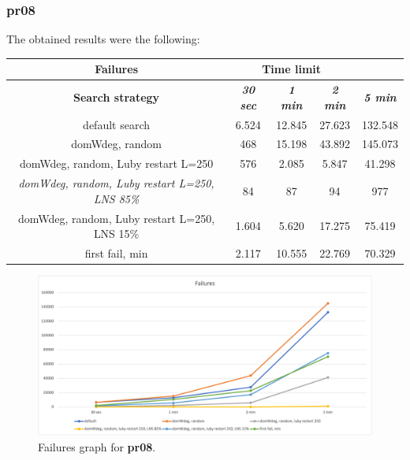 \subsubsection{pr08}
The obtained results were the following:
{
\renewcommand{\arraystretch}{2}
\begin{longtable}[h]{| c | c | c | c | c |}
    \hline
    \textbf{Failures} & \multicolumn{3}{c}{Time limit} & \\
    \hline
    \textbf{Search strategy} & \textbf{\textit{30 sec}} & \textbf{\textit{1 min}} & \textbf{\textit{2 min}} & \textbf{\textit{5 min}} \\
    \hline
    \endhead
    default search                                         & 6.524 & 12.845 &  27.623 & 132.548 \\
    \hline
    domWdeg, random                                        &  468 & 15.198 &  43.892 & 145.073 \\
    \hline
    domWdeg, random, Luby restart L=250                    &  576 &  2.085 &   5.847 &  41.298 \\
    \hline
    \textit{domWdeg, random, Luby restart L=250, LNS 85\%} &   84 &    87 &     94 &    977 \\
    \hline
    domWdeg, random, Luby restart L=250, LNS 15\%          & 1.604 &  5.620 &  17.275 &  75.419 \\
    \hline
    first fail, min                                        & 2.117 & 10.555 &  22.769 &  70.329 \\
    \hline
\end{longtable}
}
\begin{figure}[H]
    \centering
    \includegraphics[width=0.8\columnwidth]{../graphs/pr08-failures.png}
    \caption{Failures graph for \textbf{pr08}.}
\end{figure}

